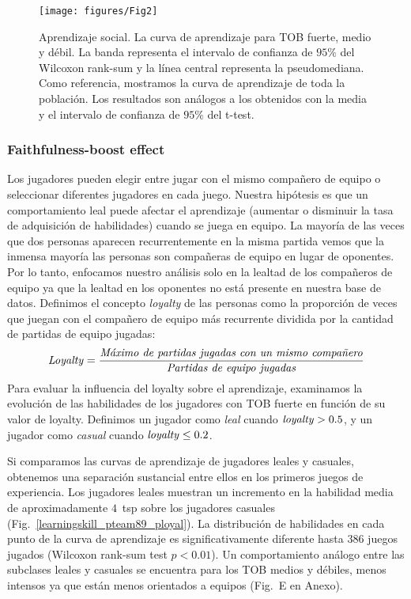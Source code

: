 \documentclass[a4paper,10pt]{book}
\theoremstyle{definition}
\begin{document}
\begin{figure}[ht!]
\centering
\texttt{[image: figures/Fig2]}
\caption{
Aprendizaje social.
%
La curva de aprendizaje para TOB fuerte, medio y débil.
%
La banda representa el intervalo de confianza de $95\%$ del Wilcoxon rank-sum y la l\'inea central representa la pseudomediana.
%
Como referencia, mostramos la curva de aprendizaje de toda la poblaci\'on.
%
Los resultados son análogos a los obtenidos con la media y el intervalo de confianza de $95\%$ del t-test.
}
\label{learningskill_team_hasta4team}
\end{figure}


\subsubsection{Faithfulness-boost effect}

Los jugadores pueden elegir entre jugar con el mismo compañero de equipo o seleccionar diferentes jugadores en cada juego.
%
Nuestra hip\'otesis es que un comportamiento leal puede afectar el aprendizaje (aumentar o disminuir la tasa de adquisici\'on de habilidades) cuando se juega en equipo.
%
La mayor\'ia de las veces que dos personas aparecen recurrentemente en la misma partida vemos que la inmensa mayor\'ia las personas son compañeras de equipo en lugar de oponentes.
%
Por lo tanto, enfocamos nuestro análisis solo en la lealtad de los compañeros de equipo ya que la lealtad en los oponentes no está presente en nuestra base de datos.
%
Definimos el concepto \emph{loyalty} de las personas como la proporci\'on de veces que juegan con el compañero de equipo más recurrente dividida por la cantidad de partidas de equipo jugadas:
%
\begin{equation}
\text{\emph{Loyalty}} = \frac{\text{\emph{Máximo de partidas jugadas con un mismo compañero}}}{\text{\emph{Partidas de equipo jugadas}}}
\end{equation}
%
Para evaluar la influencia del loyalty sobre el aprendizaje, examinamos la evoluci\'on de las habilidades de los jugadores con TOB fuerte en funci\'on de su valor de loyalty.
%
Definimos un jugador como \emph{leal} cuando $\text{\emph{loyalty}}>0.5$, y un jugador como \emph{casual} cuando $\text{\emph{loyalty}}\leq 0.2$.


Si comparamos las curvas de aprendizaje de jugadores leales y casuales, obtenemos una separaci\'on sustancial entre ellos en los primeros juegos de experiencia.
%
Los jugadores leales muestran un incremento en la habilidad media de aproximadamente $4$~tsp sobre los jugadores casuales (Fig.~\ref{learningskill_pteam89_ployal}).
%
La distribuci\'on de habilidades en cada punto de la curva de aprendizaje es significativamente diferente hasta $386$ juegos jugados (Wilcoxon rank-sum test $p<0.01$).
%
Un comportamiento análogo entre las subclases leales y casuales se encuentra para los TOB medios y débiles, menos intensos ya que están menos orientados a equipos (Fig.~E en Anexo).
\end{document}
